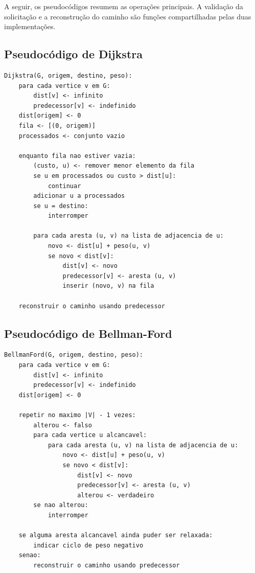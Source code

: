 \documentclass[12pt]{article}
\begin{document}
A seguir, os pseudocódigos resumem as operações principais. A validação
da solicitação e a reconstrução do caminho são funções compartilhadas
pelas duas implementações.

\subsection{Pseudocódigo de Dijkstra}

\begin{verbatim}
Dijkstra(G, origem, destino, peso):
    para cada vertice v em G:
        dist[v] <- infinito
        predecessor[v] <- indefinido
    dist[origem] <- 0
    fila <- [(0, origem)]
    processados <- conjunto vazio

    enquanto fila nao estiver vazia:
        (custo, u) <- remover menor elemento da fila
        se u em processados ou custo > dist[u]:
            continuar
        adicionar u a processados
        se u = destino:
            interromper

        para cada aresta (u, v) na lista de adjacencia de u:
            novo <- dist[u] + peso(u, v)
            se novo < dist[v]:
                dist[v] <- novo
                predecessor[v] <- aresta (u, v)
                inserir (novo, v) na fila

    reconstruir o caminho usando predecessor
\end{verbatim}

\subsection{Pseudocódigo de Bellman-Ford}

\begin{verbatim}
BellmanFord(G, origem, destino, peso):
    para cada vertice v em G:
        dist[v] <- infinito
        predecessor[v] <- indefinido
    dist[origem] <- 0

    repetir no maximo |V| - 1 vezes:
        alterou <- falso
        para cada vertice u alcancavel:
            para cada aresta (u, v) na lista de adjacencia de u:
                novo <- dist[u] + peso(u, v)
                se novo < dist[v]:
                    dist[v] <- novo
                    predecessor[v] <- aresta (u, v)
                    alterou <- verdadeiro
        se nao alterou:
            interromper

    se alguma aresta alcancavel ainda puder ser relaxada:
        indicar ciclo de peso negativo
    senao:
        reconstruir o caminho usando predecessor
\end{verbatim}
\end{document}
